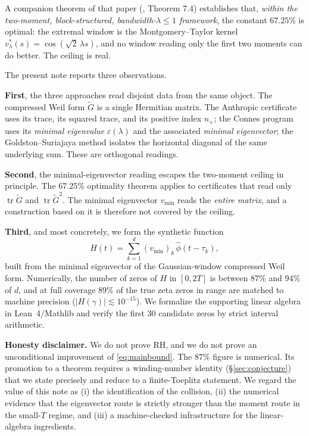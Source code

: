 \documentclass[11pt]{article}
\newcommand{\tr}{\operatorname{tr}}
\begin{document}
A companion theorem of that paper (\cite{anthropic}, Theorem 7.4) establishes that, \emph{within the two-moment, block-structured, bandwidth-$\lambda\le 1$ framework}, the constant $67.25\%$ is optimal: the extremal window is the Montgomery--Taylor kernel $v^*_\lambda(s)=\cos(\sqrt2\,\lambda s)$, and no window reading only the first two moments can do better. The ceiling is real.

The present note reports three observations.

\textbf{First}, the three approaches read disjoint data from the same object. The compressed Weil form $\tilde G$ is a single Hermitian matrix. The Anthropic certificate uses its trace, its squared trace, and its positive index $n_+$; the Connes program uses its \emph{minimal eigenvalue} $\varepsilon(\lambda)$ and the associated \emph{minimal eigenvector}; the Goldston--Suriajaya method isolates the horizontal diagonal of the same underlying sum. These are orthogonal readings.

\textbf{Second}, the minimal-eigenvector reading escapes the two-moment ceiling in principle. The $67.25\%$ optimality theorem applies to certificates that read only $\tr\tilde G$ and $\tr\tilde G^2$. The minimal eigenvector $v_{\min}$ reads the \emph{entire matrix}, and a construction based on it is therefore not covered by the ceiling.

\textbf{Third}, and most concretely, we form the synthetic function
\begin{equation}
H(t)=\sum_{k=1}^{d}(v_{\min})_k\,\hat\phi(t-\tau_k),
\label{eq:Hdef}
\end{equation}
built from the minimal eigenvector of the Gaussian-window compressed Weil form. Numerically, the number of zeros of $H$ in $[0,2T]$ is between $87\%$ and $94\%$ of $d$, and at full coverage $89\%$ of the true zeta zeros in range are matched to machine precision ($|H(\gamma)|\lesssim 10^{-15}$). We formalize the supporting linear algebra in Lean~4/Mathlib and verify the first $30$ candidate zeros by strict interval arithmetic.

\textbf{Honesty disclaimer.} We do not prove RH, and we do not prove an unconditional improvement of \eqref{eq:mainbound}. The $87\%$ figure is numerical. Its promotion to a theorem requires a winding-number identity (\S\ref{sec:conjecture}) that we state precisely and reduce to a finite-Toeplitz statement. We regard the value of this note as (i) the identification of the collision, (ii) the numerical evidence that the eigenvector route is strictly stronger than the moment route in the small-$T$ regime, and (iii) a machine-checked infrastructure for the linear-algebra ingredients.
\end{document}
